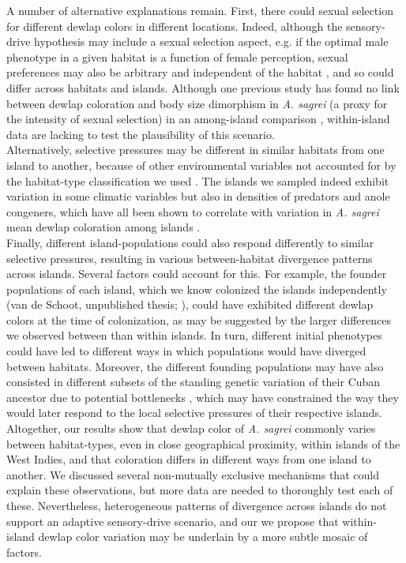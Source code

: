 A number of alternative explanations remain. First, there could sexual selection for different dewlap colors in different locations. Indeed, although the sensory-drive hypothesis may include a sexual selection aspect, e.g. if the optimal male phenotype in a given habitat is a function of female perception, sexual preferences may also be arbitrary and independent of the habitat \citep{Andersson1994}, and so could differ across habitats and islands. Although one previous study has found no link between dewlap coloration and body size dimorphism in \textit{A. sagrei} (a proxy for the intensity of sexual selection) in an among-island comparison \citep{Baeckens2018}, within-island data are lacking to test the plausibility of this scenario.\\

Alternatively, selective pressures may be different in similar habitats from one island to another, because of other environmental variables not accounted for by the habitat-type classification we used \citep{Howard1950, Schoener1968}. The islands we sampled indeed exhibit variation in some climatic variables but also in densities of predators and anole congeners, which have all been shown to correlate with variation in \textit{A. sagrei} mean dewlap coloration among islands \citep{Vanhooydonck2009, Baeckens2018}.\\

Finally, different island-populations could also respond differently to similar selective pressures, resulting in various between-habitat divergence patterns across islands. Several factors could account for this. For example, the founder populations of each island, which we know colonized the islands independently (van de Schoot, unpublished thesis; \citealt{Driessens2017, Reynolds2020}), could have exhibited different dewlap colors at the time of colonization, as may be suggested by the larger differences we observed between than within islands. In turn, different initial phenotypes could have led to different ways in which populations would have diverged between habitats. Moreover, the different founding populations may have also consisted in different subsets of the standing genetic variation of their Cuban ancestor due to potential bottlenecks \citep{Reynolds2020}, which may have constrained the way they would later respond to the local selective pressures of their respective islands.\\

Altogether, our results show that dewlap color of \textit{A. sagrei} commonly varies between habitat-types, even in close geographical proximity, within islands of the West Indies, and that coloration differs in different ways from one island to another. We discussed several non-mutually exclusive mechanisms that could explain these observations, but more data are needed to thoroughly test each of these. Nevertheless, heterogeneous patterns of divergence across islands do not support an adaptive sensory-drive scenario, and our we propose that within-island dewlap color variation may be underlain by a more subtle mosaic of factors.

